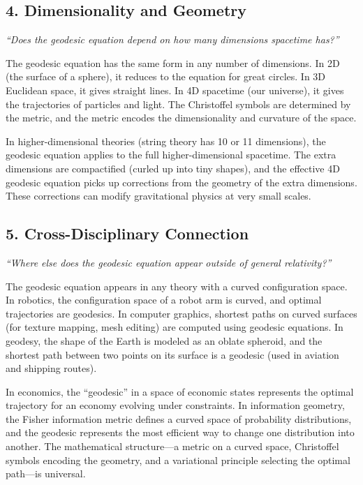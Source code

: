 \subsection*{4. Dimensionality and Geometry}
\textit{``Does the geodesic equation depend on how many dimensions spacetime has?''}

The geodesic equation has the same form in any number of dimensions. In 2D (the surface of a sphere), it reduces to the equation for great circles. In 3D Euclidean space, it gives straight lines. In 4D spacetime (our universe), it gives the trajectories of particles and light. The Christoffel symbols are determined by the metric, and the metric encodes the dimensionality and curvature of the space.

In higher-dimensional theories (string theory has 10 or 11 dimensions), the geodesic equation applies to the full higher-dimensional spacetime. The extra dimensions are compactified (curled up into tiny shapes), and the effective 4D geodesic equation picks up corrections from the geometry of the extra dimensions. These corrections can modify gravitational physics at very small scales.

\subsection*{5. Cross-Disciplinary Connection}
\textit{``Where else does the geodesic equation appear outside of general relativity?''}

The geodesic equation appears in any theory with a curved configuration space. In robotics, the configuration space of a robot arm is curved, and optimal trajectories are geodesics. In computer graphics, shortest paths on curved surfaces (for texture mapping, mesh editing) are computed using geodesic equations. In geodesy, the shape of the Earth is modeled as an oblate spheroid, and the shortest path between two points on its surface is a geodesic (used in aviation and shipping routes).

In economics, the ``geodesic'' in a space of economic states represents the optimal trajectory for an economy evolving under constraints. In information geometry, the Fisher information metric defines a curved space of probability distributions, and the geodesic represents the most efficient way to change one distribution into another. The mathematical structure---a metric on a curved space, Christoffel symbols encoding the geometry, and a variational principle selecting the optimal path---is universal.

